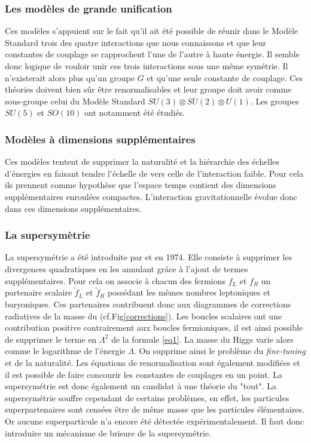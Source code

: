 \subsubsection{Les modèles de grande unification}
Ces modèles s'appuient sur le fait qu'il ait été possible de réunir dans le Modèle Standard trois des quatre interactions que nous connaissons et que leur constantes de couplage se rapprochent l'une de l'autre à haute énergie. Il semble donc logique de vouloir unir ces trois interactions sous une même symétrie. Il n'existerait alors plus qu'un groupe $G$ et qu'une seule constante de couplage. Ces théories doivent bien sûr être renormalisables et leur groupe doit avoir comme sous-groupe celui du Modèle Standard $SU(3)\otimes SU(2) \otimes U(1)$. Les groupes $SU(5)$ et $SO(10)$ ont notamment été étudiés.

\subsubsection{Modèles à dimensions supplémentaires}
Ces modèles tentent de supprimer la naturalité et la hiérarchie des échelles d'énergies en faisant tendre l'échelle de  vers celle de l'interaction faible. Pour cela ils prennent comme hypothèse que l'espace temps contient des dimensions supplémentaires enroulées compactes. L'interaction gravitationnelle évolue donc dans ces dimensions supplémentaires.

\subsubsection{La supersymètrie}
La supersymétrie a été introduite par  et  en \num{1974}. Elle consiste à supprimer les divergences quadratiques en les annulant grâce à l'ajout de termes supplémentaires. Pour cela on associe à chacun des fermions $f_{L}$ et $f_{R}$ un partenaire scalaire $\tilde{f}_{L}$ et $\tilde{f}_{R}$ possédant les mêmes nombres leptoniques et baryoniques. Ces partenaires contribuent donc aux diagrammes de corrections radiatives de la masse du  (cf.Fig\ref{corrections}). Les boucles scalaires ont une contribution positive contrairement aux boucles fermioniques, il est ainsi possible de supprimer le terme en $\Lambda^2$ de la formule \ref{eq1}. La masse du Higgs varie alors comme le logarithme de l'énergie $\Lambda$. On supprime ainsi le problème du \textit{fine-tuning} et de la naturalité. Les équations de renormalisation sont également modifiées et il est possible de faire concourir les constantes de couplages en un point. La supersymétrie est donc également un candidat à une théorie du "tout". La supersymétrie souffre cependant de certains problèmes, en effet, les particules superpartenaires sont censées être de même masse que les particules élémentaires. Or aucune superparticule n'a encore été détectée expérimentalement. Il faut donc introduire un mécanisme de brisure de la supersymétrie.

